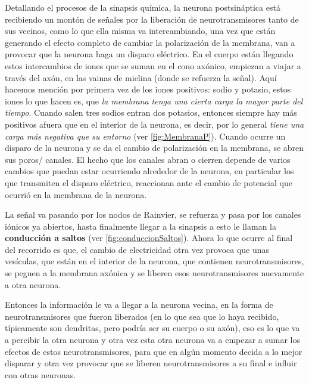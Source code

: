 Detallando el procesos de la sinapsis química, la neurona postsináptica está recibiendo un montón de señales por la liberación de neurotransmisores tanto de sus vecinos, como lo que ella misma va intercambiando, una vez que están generando el efecto completo de cambiar la polarización de la membrana, van a provocar que la neurona haga un disparo eléctrico. En el cuerpo están llegando estos intercambios de iones que se suman en el cono axónico, empiezan a viajar a través del axón, en las vainas de mielina (donde se refuerza la señal). 
Aquí hacemos mención por primera vez de los iones positivos: sodio y potasio, estos iones lo que hacen es, que \emph{la membrana tenga una cierta carga la mayor parte del tiempo}. Cuando salen tres sodios entran dos potasios, entonces siempre hay más positivos afuera que en el interior de la neurona, es decir, por lo general  \emph{tiene una carga más negativa que su entorno} (ver \ref{fig:MembranaP}). Cuando ocurre un disparo de la neurona y se da el cambio de polarización en la membrana, se abren sus poros/ canales. El hecho que los canales abran o cierren depende de varios cambios que puedan estar ocurriendo alrededor de la neurona, en particular los que transmiten el disparo eléctrico, reaccionan ante el cambio de potencial que ocurrió en la membrana de la neurona. 

La señal va pasando por los nodos de Rainvier, se refuerza y pasa por los canales iónicos ya abiertos, hasta finalmente llegar a la sinapsis a esto le llaman la \textbf{conducción a saltos} (ver \ref{fig:conduccionSaltos}). Ahora lo que ocurre al final del recorrido es que, el cambio de electricidad otra vez provoca que unas vesículas, que están en el interior de la neurona, que contienen neurotransmisores, se peguen a la membrana axónica y se liberen esos neurotransmisores nuevamente a otra neurona. 

Entonces la información le va a llegar a la neurona vecina, en la forma de neurotransmisores que fueron liberados (en lo que sea que lo haya recibido, típicamente son dendritas, pero podría ser su cuerpo o su axón), eso es lo que va a percibir la otra neurona y otra vez esta otra neurona va a empezar a sumar los efectos de estos neurotransmisores, para que en algún momento decida a lo mejor disparar y otra vez provocar que se liberen neurotransmisores a su final e influir con otras neuronas.

